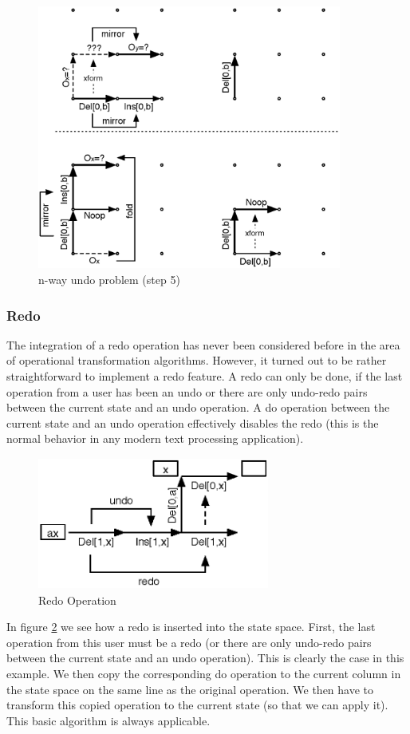 \begin{figure}[H]
 \centering
 \includegraphics[width=10cm,height=8.69cm]{../../images/concepts_transformation-history-5.eps}
 \caption{n-way undo problem (step 5)}
 \label{fig:concepts.transformation-history-5}
\end{figure}


\subsubsection{Redo}
The integration of a redo operation has never been considered before in the area of operational transformation algorithms. However, it turned out to be rather straightforward to implement a redo feature. A redo can only be done, if the last operation from a user has been an undo or there are only undo-redo pairs between the current state and an undo operation. A do operation between the current state and an undo operation effectively disables the redo (this is the normal behavior in any modern text processing application).

\begin{figure}[htb]
 \centering
 \includegraphics[width=7.62cm,height=4.34cm]{../../images/concepts_redo.eps}
 \caption{Redo Operation}
 \label{fig:concepts.redo}
\end{figure}

In figure \ref{fig:concepts.redo} we see how a redo is inserted into the state space. First, the last operation from this user must be a redo (or there are only undo-redo pairs between the current state and an undo operation). This is clearly the case in this example. We then copy the corresponding do operation to the current column in the state space on the same line as the original operation. We then have to transform this copied operation to the current state (so that we can apply it). This basic algorithm is always applicable.
